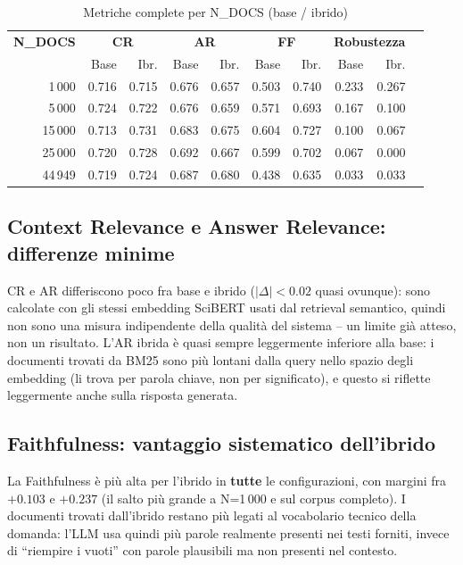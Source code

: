 \documentclass[12pt,a4paper]{article}
\begin{document}
\begin{table}[H]
  \centering
  \caption{Metriche complete per N\_DOCS (base / ibrido)}
  \small
  \begin{tabular}{rrrrrrrrrr}
    \toprule
    \textbf{N\_DOCS} & \multicolumn{2}{c}{\textbf{CR}} & \multicolumn{2}{c}{\textbf{AR}} & \multicolumn{2}{c}{\textbf{FF}} & \multicolumn{2}{c}{\textbf{Robustezza}} \\
     & Base & Ibr. & Base & Ibr. & Base & Ibr. & Base & Ibr. \\
    \midrule
    1\,000  & 0.716 & 0.715 & 0.676 & 0.657 & 0.503 & 0.740 & 0.233 & 0.267 \\
    5\,000  & 0.724 & 0.722 & 0.676 & 0.659 & 0.571 & 0.693 & 0.167 & 0.100 \\
    15\,000 & 0.713 & 0.731 & 0.683 & 0.675 & 0.604 & 0.727 & 0.100 & 0.067 \\
    25\,000 & 0.720 & 0.728 & 0.692 & 0.667 & 0.599 & 0.702 & 0.067 & 0.000 \\
    44\,949 & 0.719 & 0.724 & 0.687 & 0.680 & 0.438 & 0.635 & 0.033 & 0.033 \\
    \bottomrule
  \end{tabular}
\end{table}

\subsection{Context Relevance e Answer Relevance: differenze minime}
\label{sec:cr-ar}

CR e AR differiscono poco fra base e ibrido ($|\Delta| < 0.02$ quasi ovunque): sono calcolate con gli stessi embedding SciBERT usati dal retrieval semantico, quindi non sono una misura indipendente della qualit\`a del sistema -- un limite gi\`a atteso, non un risultato. L'AR ibrida \`e quasi sempre leggermente inferiore alla base: i documenti trovati da BM25 sono pi\`u lontani dalla query nello spazio degli embedding (li trova per parola chiave, non per significato), e questo si riflette leggermente anche sulla risposta generata.

\subsection{Faithfulness: vantaggio sistematico dell'ibrido}

La Faithfulness \`e pi\`u alta per l'ibrido in \textbf{tutte} le configurazioni, con margini fra $+0.103$ e $+0.237$ (il salto pi\`u grande a N=1\,000 e sul corpus completo). I documenti trovati dall'ibrido restano pi\`u legati al vocabolario tecnico della domanda: l'LLM usa quindi pi\`u parole realmente presenti nei testi forniti, invece di ``riempire i vuoti'' con parole plausibili ma non presenti nel contesto.
\end{document}
